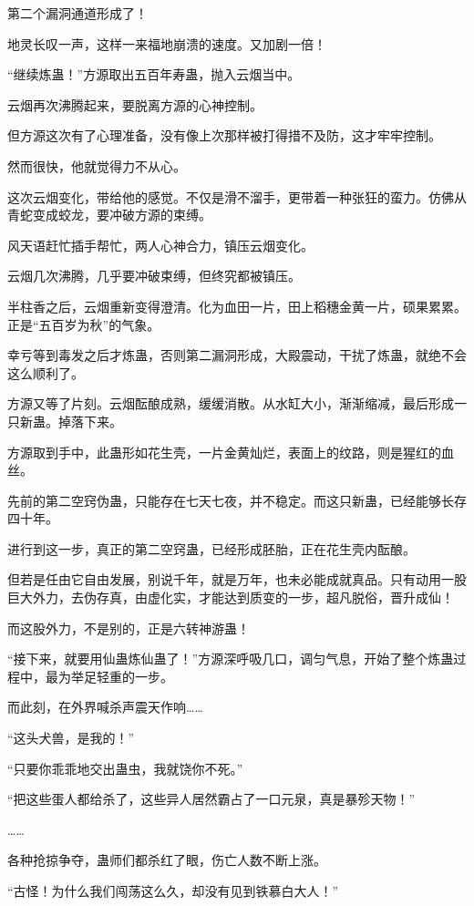 \begin{this_body}
第二个漏洞通道形成了！

地灵长叹一声，这样一来福地崩溃的速度。又加剧一倍！

“继续炼蛊！”方源取出五百年寿蛊，抛入云烟当中。

云烟再次沸腾起来，要脱离方源的心神控制。

但方源这次有了心理准备，没有像上次那样被打得措不及防，这才牢牢控制。

然而很快，他就觉得力不从心。

这次云烟变化，带给他的感觉。不仅是滑不溜手，更带着一种张狂的蛮力。仿佛从青蛇变成蛟龙，要冲破方源的束缚。

风天语赶忙插手帮忙，两人心神合力，镇压云烟变化。

云烟几次沸腾，几乎要冲破束缚，但终究都被镇压。

半柱香之后，云烟重新变得澄清。化为血田一片，田上稻穗金黄一片，硕果累累。正是“五百岁为秋”的气象。

幸亏等到毒发之后才炼蛊，否则第二漏洞形成，大殿震动，干扰了炼蛊，就绝不会这么顺利了。

方源又等了片刻。云烟酝酿成熟，缓缓消散。从水缸大小，渐渐缩减，最后形成一只新蛊。掉落下来。

方源取到手中，此蛊形如花生壳，一片金黄灿烂，表面上的纹路，则是猩红的血丝。

先前的第二空窍伪蛊，只能存在七天七夜，并不稳定。而这只新蛊，已经能够长存四十年。

进行到这一步，真正的第二空窍蛊，已经形成胚胎，正在花生壳内酝酿。

但若是任由它自由发展，别说千年，就是万年，也未必能成就真品。只有动用一股巨大外力，去伪存真，由虚化实，才能达到质变的一步，超凡脱俗，晋升成仙！

而这股外力，不是别的，正是六转神游蛊！

“接下来，就要用仙蛊炼仙蛊了！”方源深呼吸几口，调匀气息，开始了整个炼蛊过程中，最为举足轻重的一步。

而此刻，在外界喊杀声震天作响……

“这头犬兽，是我的！”

“只要你乖乖地交出蛊虫，我就饶你不死。”

“把这些蛋人都给杀了，这些异人居然霸占了一口元泉，真是暴殄天物！”

……

各种抢掠争夺，蛊师们都杀红了眼，伤亡人数不断上涨。

“古怪！为什么我们闯荡这么久，却没有见到铁慕白大人！”


\end{this_body}
